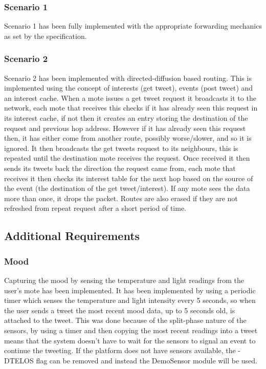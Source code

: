 \documentclass{article}
\begin{document}
\subsubsection{Scenario 1}
Scenario 1 has been fully implemented with the appropriate forwarding mechanics as set by the specification.

\subsubsection{Scenario 2}
\label{sec:dd}
Scenario 2 has been implemented with directed-diffusion based routing. This is implemented using the concept of interests (get tweet), events (post tweet) and an interest cache. When a mote issues a get tweet request it broadcasts it to the network, each mote that receives this checks if it has already seen this request in its interest cache, if not then it creates an entry storing the destination of the request and previous hop address. However if it has already seen this request then, it has either come from another route, possibly worse/slower, and so it is ignored. It then broadcasts the get tweets request to its neighbours, this is repeated until the destination mote receives the request. Once received it then sends its tweets back the direction the request came from, each mote that receives it then checks its interest table for the next hop based on the source of the event (the destination of the get tweet/interest). If any mote sees the data more than once, it drops the packet. Routes are also erased if they are not refreshed from repeat request after a short period of time.

\subsection{Additional Requirements}
\subsubsection{Mood}
Capturing the mood by sensing the temperature and light readings from the user's mote has been implemented. It has been implemented by using a periodic timer which senses the temperature and light intensity every 5 seconds, so when the user sends a tweet the most recent mood data, up to 5 seconds old, is attached to the tweet. This was done because of the split-phase nature of the sensors, by using a timer and then copying the most recent readings into a tweet means that the system doesn't have to wait for the sensors to signal an event to continue the tweeting.
If the platform does not have sensors available, the -DTELOS flag can be removed and instead the DemoSensor module will be used.
\end{document}
